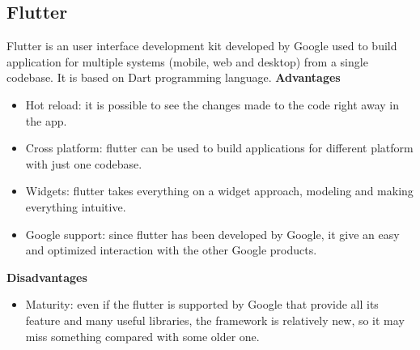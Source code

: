 \documentclass[../ITD.tex]{subfiles}
\begin{document}
    \subsection{Flutter}\label{subsec:flutter}
    Flutter is an user interface development kit developed by Google used to build application for multiple systems (mobile, web and desktop) from a single codebase.
    It is based on Dart programming language.
    \newline
    \textbf{Advantages}
    \begin{itemize}
        \item Hot reload: it is possible to see the changes made to the code right away in the app.
        \item Cross platform: flutter can be used to build applications for different platform with just one codebase.
        \item Widgets: flutter takes everything on a widget approach, modeling and making everything intuitive.
        \item Google support: since flutter has been developed by Google, it give an easy and optimized interaction with the other Google products.
    \end{itemize}

    \textbf{Disadvantages}
    \begin{itemize}
        \item Maturity: even if the flutter is supported by Google that provide all its feature and many useful libraries, the framework is relatively new, so it may miss something compared with some older one.
    \end{itemize}
\end{document}
